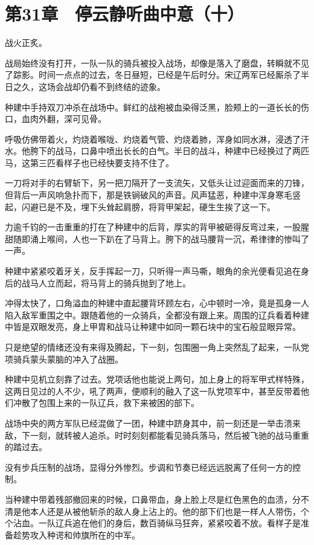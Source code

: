 \section{第31章　停云静听曲中意（十）}

战火正炙。

战局始终没有打开，一队一队的骑兵被投入战场，却像是落入了磨盘，转瞬就不见了踪影。时间一点点的过去，冬日昼短，已经是午后时分。宋辽两军已经厮杀了半日之久，这场会战却仍看不到终结的迹象。

种建中手持双刀冲杀在战场中。鲜红的战袍被血染得泛黑，脸颊上的一道长长的伤口，血肉外翻，深可见骨。

呼吸仿佛带着火，灼烧着喉咙、灼烧着气管、灼烧着肺，浑身如同水淋，浸透了汗水。他胯下的战马，口鼻中喷出长长的白气。半日的战斗，种建中已经换过了两匹马，这第三匹看样子也已经快要支持不住了。

一刀将对手的右臂斩下，另一把刀隔开了一支流矢，又低头让过迎面而来的刀锋，但背后一声风响急扑而下，那是铁锏破风的声音。风声猛恶，种建中浑身寒毛竖起，闪避已是不及，埋下头耸起肩膀，将背甲架起，硬生生挨了这一下。

力逾千钧的一击重重的打在了种建中的后背，厚实的背甲被砸得反弯过来，一股腥甜随即涌上喉间，人也一下趴在了马背上。胯下的战马腰背一沉，希律律的惨叫了一声。

种建中紧紧咬着牙关，反手挥起一刀，只听得一声马嘶，眼角的余光便看见追在身后的战马人立而起，将马背上的骑兵抛到了地上。

冲得太快了，口角溢血的种建中直起腰背环顾左右，心中顿时一冷，竟是孤身一人陷入敌军重围之中。跟随着他的一众骑兵，全都没有跟上来。周围的辽兵看着种建中皆是双眼发亮，身上甲胄和战马让种建中如同一颗石块中的宝石般显眼异常。

只是绝望的情绪还没有来得及腾起，下一刻，包围圈一角上突然乱了起来，一队党项骑兵蒙头蒙脑的冲入了战圈。

种建中见机立刻靠了过去。党项话他也能说上两句，加上身上的将军甲式样特殊，这两日见过的人不少，吼了两声，便顺利的融入了这一队党项军中，甚至反带着他们冲散了包围上来的一队辽兵，救下来被困的部下。

战场中央的两方军队已经混做了一团，种建中跻身其中，前一刻还是一举击溃来敌，下一刻，就转被人追杀。时时刻刻都能看见骑兵落马，然后被飞驰的战马重重的踏过去。

没有步兵压制的战场，显得分外惨烈。步调和节奏已经远远脱离了任何一方的控制。

当种建中带着残部撤回来的时候，口鼻带血，身上脸上尽是红色黑色的血渍，分不清是他本人还是从被他斩杀的敌人身上沾上的。他的部下们也是一样人人带伤，个个沾血。一队辽兵追在他们的身后，数百骑纵马狂奔，紧紧咬着不放。看样子是准备趁势攻入种谔和帅旗所在的中军。

